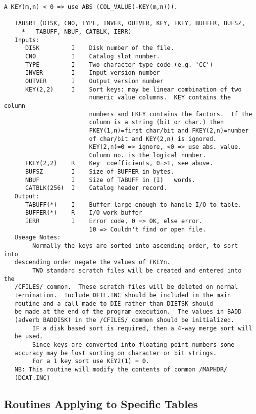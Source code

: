 \begin{verbatim}
A KEY(m,n) < 0 => use ABS (COL_VALUE(-KEY(m,n))).

   TABSRT (DISK, CNO, TYPE, INVER, OUTVER, KEY, FKEY, BUFFER, BUFSZ,
     *   TABUFF, NBUF, CATBLK, IERR)
   Inputs:
      DISK         I    Disk number of the file.
      CNO          I    Catalog slot number.
      TYPE         I    Two character type code (e.g. 'CC')
      INVER        I    Input version number
      OUTVER       I    Output version number
      KEY(2,2)     I    Sort keys: may be linear combination of two
                        numeric value columns.  KEY contains the column
                        numbers and FKEY contains the factors.  If the
                        column is a string (bit or char.) then
                        FKEY(1,n)=first char/bit and FKEY(2,n)=number
                        of char/bit and KEY(2,n) is ignored.
                        KEY(2,n)=0 => ignore, <0 => use abs. value.
                        Column no. is the logical number.
      FKEY(2,2)    R    Key  coefficients, 0=>1, see above.
      BUFSZ        I    Size of BUFFER in bytes.
      NBUF         I    Size of TABUFF in (I)   words.
      CATBLK(256)  I    Catalog header record.
   Output:
      TABUFF(*)    I    Buffer large enough to handle I/O to table.
      BUFFER(*)    R    I/O work buffer
      IERR         I    Error code, 0 => OK, else error.
                        10 => Couldn't find or open file.
   Useage Notes:
        Normally the keys are sorted into ascending order, to sort into
   descending order negate the values of FKEYn.
        TWO standard scratch files will be created and entered into the
   /CFILES/ common.  These scratch files will be deleted on normal
   termination.  Include DFIL.INC should be included in the main
   routine and a call made to DIE rather than DIETSK should
   be made at the end of the program execution.  The values in BADD
   (adverb BADDISK) in the /CFILES/ common should be initialized.
        IF a disk based sort is required, then a 4-way merge sort will
   be used.
        Since keys are converted into floating point numbers some
   accuracy may be lost sorting on character or bit strings.
        For a 1 key sort use KEY2(1) = 0.
   NB: This routine will modify the contents of common /MAPHDR/
   (DCAT.INC)
\end{verbatim}


\subsection{Routines Applying to Specific Tables }

